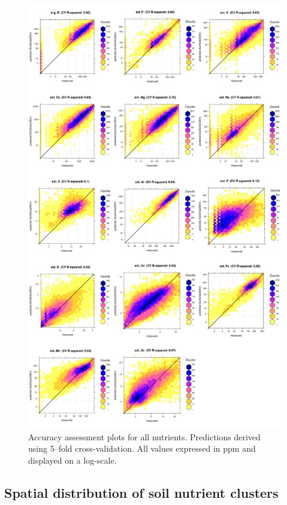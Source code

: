 \begin{linenumbers}
\begin{figure}[!hp]
\includegraphics[width=\textwidth]{Fig_results_CV.png}
\caption{Accuracy assessment plots for all nutrients. Predictions derived using 5--fold cross-validation. All values expressed in ppm and displayed on a log-scale.}
\label{fig:accuracy_plots}
\end{figure}

\clearpage

\subsection{Spatial distribution of soil nutrient clusters}


\end{linenumbers}
